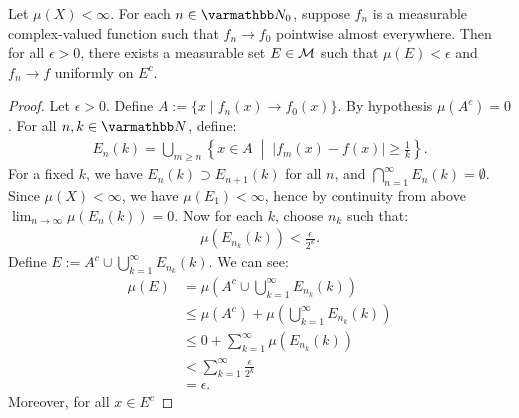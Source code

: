 \begin{theorem}
    Let $\mu(X) < \infty$. For each $n \in \bfN_0$, suppose $f_n$ is a measurable complex-valued function such that $f_n \rightarrow f_0$ pointwise almost everywhere. Then for all $\epsilon > 0$, there exists a measurable set $E \in \mathcal{M}$ such that $\mu(E) < \epsilon$ and $f_n \rightarrow f$ uniformly on $E^c$.
\end{theorem}
    \begin{proof}
        Let $\epsilon > 0$. Define $A := \{x \mid f_n(x) \rightarrow f_0(x)\}$. By hypothesis $\mu(A^c) = 0$. For all $n,k \in \bfN$, define:
            \begin{equation*}
            \begin{split}
                E_n(k) = \bigcup_{m \geq n}\left\{x \in A \;\middle|\; |f_m(x) - f(x)| \geq \frac{1}{k}\right\}.
            \end{split}
            \end{equation*}
        For a fixed $k$, we have $E_{n}(k) \supset E_{n+1}(k)$ for all $n$, and $\bigcap_{n = 1}^\infty E_n(k) = \emptyset$. Since $\mu(X) < \infty$, we have $\mu(E_1) < \infty$, hence by continuity from above $\lim_{n \rightarrow \infty}\mu(E_n(k)) = 0$. Now for each $k$, choose $n_k$ such that:
            \begin{equation*}
            \begin{split}
                \mu(E_{n_k}(k)) < \frac{\epsilon}{2^k}.
            \end{split}
            \end{equation*}
        Define $E := A^c \cup \bigcup_{k = 1}^\infty E_{n_k}(k)$. We can see:
            \begin{equation*}
            \begin{split}
                \mu(E) 
                & = \mu\left(A^c \cup \bigcup_{k = 1}^\infty E_{n_k}(k)\right) \\
                & \leq \mu(A^c) + \mu \left( \bigcup_{k = 1}^\infty E_{n_k}(k) \right) \\
                & \leq 0 + \sum_{k = 1}^\infty \mu(E_{n_k}(k)) \\
                & < \sum_{k = 1}^\infty \frac{\epsilon}{2^k} \\
                & = \epsilon.
            \end{split}
            \end{equation*}
        Moreover, for all $x \in E^c$
    \end{proof}

